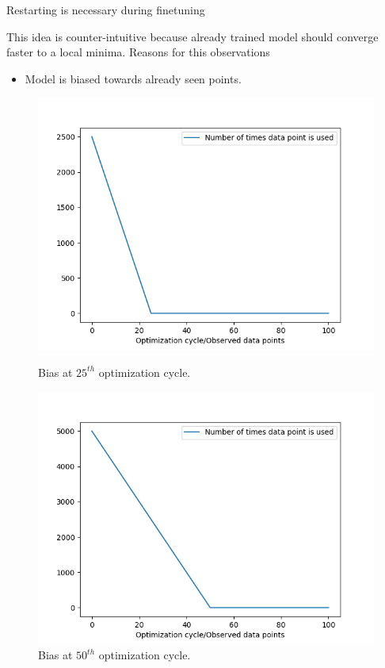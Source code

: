\documentclass{beamer}
\begin{document}
\begin{frame}[t]{Restarting is necessary during finetuning}

This idea is counter-intuitive because already trained model should converge faster to a local minima.  Reasons for this observations
\begin{itemize}
\item Model is biased towards already seen points.
\end{itemize}

\begin{figure}[h]%
\centering
\begin{minipage}{0.45\textwidth}
\includegraphics[width=\textwidth]{images/bias25}
\caption{Bias at $25^{th}$ optimization cycle.}
    \label{fig:bias25}
\end{minipage}\hfill
\begin{minipage}{0.45\textwidth}
\includegraphics[width=\textwidth]{images/bias50}
\caption{Bias at $50^{th}$ optimization cycle.}
    \label{fig:bias50}
\end{minipage}\par
\end{figure}

\end{frame}
\end{document}
